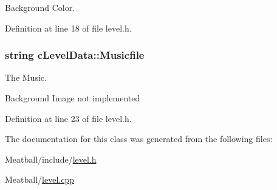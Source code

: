 Background Color. 



Definition at line 18 of file level.\-h.

\hypertarget{classc_level_data_ac2a28344b83ea2d8c093d8f0d4552d2b}{
\subsubsection[{Musicfile}]{\setlength{\rightskip}{0pt plus 5cm}string c\-Level\-Data\-::\-Musicfile}}\label{classc_level_data_ac2a28344b83ea2d8c093d8f0d4552d2b}


The Music. 

Background Image not implemented 

Definition at line 23 of file level.\-h.



The documentation for this class was generated from the following files\-:\begin{DoxyCompactItemize}
\item 
Meatball/include/\hyperlink{level_8h}{level.\-h}\item 
Meatball/\hyperlink{level_8cpp}{level.\-cpp}\end{DoxyCompactItemize}
